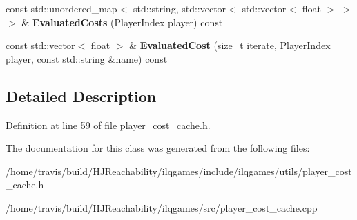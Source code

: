 \begin{DoxyCompactItemize}
\item 
const std\+::unordered\+\_\+map$<$ std\+::string, std\+::vector$<$ std\+::vector$<$ float $>$ $>$ $>$ \& {\bfseries Evaluated\+Costs} (Player\+Index player) const \hypertarget{classilqgames_1_1_player_cost_cache_a73ac0a7ad44ca59451ebafce96af788a}{}\label{classilqgames_1_1_player_cost_cache_a73ac0a7ad44ca59451ebafce96af788a}

\item 
const std\+::vector$<$ float $>$ \& {\bfseries Evaluated\+Cost} (size\+\_\+t iterate, Player\+Index player, const std\+::string \&name) const \hypertarget{classilqgames_1_1_player_cost_cache_a95f82d286ddb9c91a31ad88fd13eeabc}{}\label{classilqgames_1_1_player_cost_cache_a95f82d286ddb9c91a31ad88fd13eeabc}

\end{DoxyCompactItemize}


\subsection{Detailed Description}


Definition at line 59 of file player\+\_\+cost\+\_\+cache.\+h.



The documentation for this class was generated from the following files\+:\begin{DoxyCompactItemize}
\item 
/home/travis/build/\+H\+J\+Reachability/ilqgames/include/ilqgames/utils/player\+\_\+cost\+\_\+cache.\+h\item 
/home/travis/build/\+H\+J\+Reachability/ilqgames/src/player\+\_\+cost\+\_\+cache.\+cpp\end{DoxyCompactItemize}
